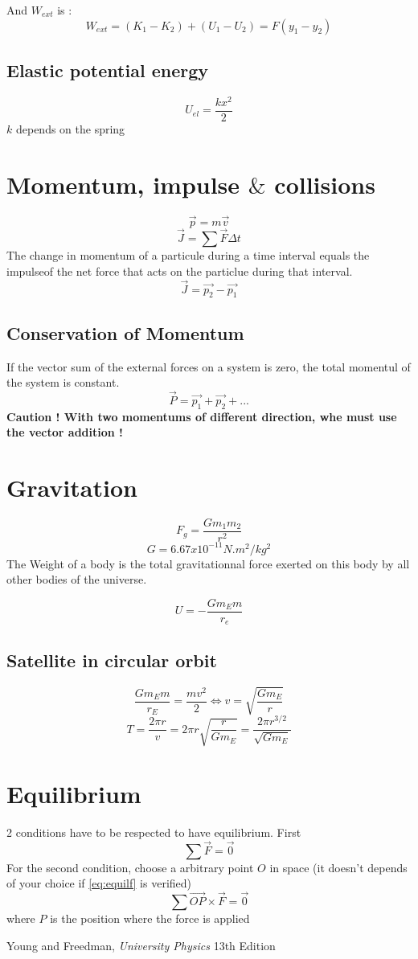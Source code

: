 \documentclass[a4paper,10pt]{article}
\begin{document}
And $W_{ext}$ is :
\[W_{ext} = (K_1 - K_2) + (U_1 - U_2) = F(y_1 - y_2)\]

\subsection{Elastic potential energy}
\[U_{el} = \frac{kx^2}{2}\]
$k$ depends on the spring

\section{Momentum, impulse $\&$ collisions}
\[\vec{p} = m\vec{v}\]
\[\vec{J} = \sum{} \vec{F}\Delta t\]
The change in momentum of a particule during a time interval equals the impulseof the net force that acts on the particlue during that interval.
\[\vec{J} = \vec{p_2} - \vec{p_1}\]

\subsection{Conservation of Momentum}
If the vector sum of the external forces on a system is zero, the total momentul of the system is constant.
\[\vec{P} = \vec{p_1} + \vec{p_2} + ...\]
{ \bf Caution ! With two momentums of different direction, whe must use the vector addition !}

\section{Gravitation}
\[F_g = \frac{Gm_1m_2}{r^2}\]
\[G = 6.67x10^{-11} N.m^2/kg^2\]
The Weight of a body is the total gravitationnal force exerted on this body by all other bodies of the universe.

\[U = -\frac{Gm_Em}{r_e}\]

\subsection{Satellite in circular orbit}
\[ \frac{Gm_Em}{r_E} = \frac{mv^2}{2} \Leftrightarrow v = \sqrt{\frac{Gm_E}{r}} \]
\[T = \frac{2\pi r}{v} = 2\pi r \sqrt{\frac{r}{Gm_E}} = \frac{2\pi r^{3/2}}{\sqrt{Gm_E}}\]

\section{Equilibrium}
2 conditions have to be respected to have equilibrium. First
\begin{equation}\label{eq:equilf}
	\sum \vec{F} = \vec{0}
\end{equation}
For the second condition, choose a arbitrary point $O$ in space
(it doesn't depends of your choice if \eqref{eq:equilf} is verified)
$$\sum \vec{OP} \times \vec{F} = \vec{0}$$
where $P$ is the position where the force is applied


\begin{thebibliography}{9}

	Young and Freedman,
	\emph{University Physics}
	13th Edition

\end{thebibliography}
\end{document}
